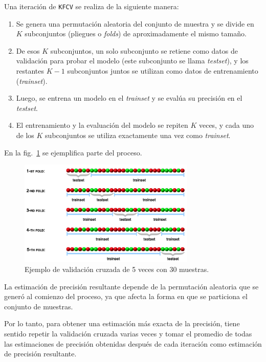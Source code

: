\documentclass[a4paper,12pt]{article}
\begin{document}
Una iteración de \texttt{KFCV} se realiza de la siguiente manera: 

\begin{enumerate}
	\item Se genera una permutación aleatoria del conjunto de muestra y se divide en $K$ subconjuntos (pliegues o \textit{folds}) de aproximadamente el mismo tamaño.
	\item De esos $K$ subconjuntos, un solo subconjunto se retiene como datos de validación para probar el modelo (este subconjunto se llama \textit{testset}), y los restantes $K-1$ subconjuntos juntos se utilizan como datos de entrenamiento (\textit{trainset}).
	\item Luego, se entrena un modelo en el \textit{trainset} y se evalúa su precisión en el \textit{testset}. 
	\item El entrenamiento y la evaluación del modelo se repiten $K$ veces, y cada uno de los $K$ subconjuntos se utiliza exactamente una vez como \textit{trainset}.
\end{enumerate}

En la fig.~\ref{fig:kfolds} se ejemplifica parte del proceso.

\begin{figure}[H]
	\begin{center}
	\includegraphics[width=0.75\textwidth]{tesis_67.png}
  	\caption{Ejemplo de validación cruzada de 5 veces con 30 muestras.}
  	\label{fig:kfolds}
  	\end{center}
\end{figure}

La estimación de precisión resultante depende de la permutación aleatoria que se generó al comienzo del proceso, ya que afecta la forma en que se particiona el conjunto de muestras. 

Por lo tanto, para obtener una estimación más exacta de la precisión, tiene sentido repetir la validación cruzada varias veces y tomar el promedio de todas las estimaciones de precisión obtenidas después de cada iteración como estimación de precisión resultante.
\end{document}
